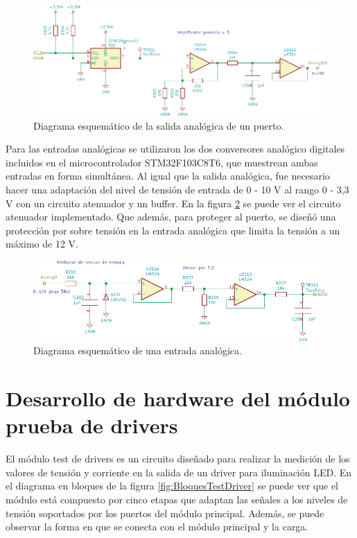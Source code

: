 \begin{figure}[H]
	\centering
	\includegraphics[width=1\textwidth]{./Figures/SalidaAnalogica.pdf}
	\caption{Diagrama esquemático de la salida analógica de un puerto.}
	\label{fig:SalidaAnalogica}
\end{figure}

Para las entradas analógicas se utilizaron los dos conversores analógico digitales incluidos en el microcontrolador STM32F103C8T6, que muestrean ambas entradas en forma simultánea. Al igual que la salida analógica, fue necesario hacer una adaptación del nivel de tensión de entrada de 0 - 10 V al rango 0 - 3,3 V con un circuito atenuador y un buffer. En la figura \ref{fig:EntradaAnalogica} se puede ver el circuito atenuador implementado. Que además, para proteger al puerto, se diseñó una protección por sobre tensión en la entrada analógica que limita la tensión a un máximo de 12 V.

\begin{figure}[H]
	\centering
	\includegraphics[width=1\textwidth]{./Figures/EntradaAnalogica.pdf}
	\caption{Diagrama esquemático de una entrada analógica.}
	\label{fig:EntradaAnalogica}
\end{figure}




\section{Desarrollo de hardware del módulo prueba de drivers}

El módulo test de drivers es un circuito diseñado para realizar la medición de los valores de tensión y corriente en la salida de un driver para iluminación LED. En el diagrama en bloques de la figura \ref{fig:BloquesTestDriver} se puede ver que el módulo está compuesto por cinco etapas que adaptan las señales a los niveles de tensión soportados por los puertos del módulo principal. Además, se puede observar la forma en que se conecta con el módulo principal y la carga.

